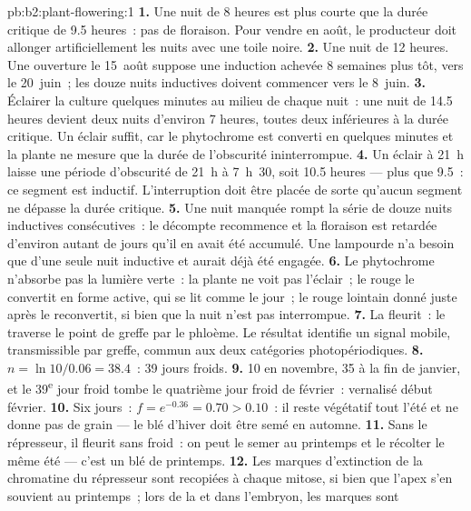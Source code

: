 \begin{solution}{pb:b2:plant-flowering:1}
\textbf{1.} Une nuit de 8 heures est plus courte que la durée critique
de 9.5 heures~: pas de floraison. Pour vendre en août, le producteur doit
allonger artificiellement les nuits avec une toile noire.
\textbf{2.} Une nuit de 12 heures. Une ouverture le 15~août suppose une
induction achevée 8 semaines plus tôt, vers le 20~juin~; les douze nuits
inductives doivent commencer vers le 8~juin.
\textbf{3.} Éclairer la culture quelques minutes au milieu de chaque
nuit~: une nuit de 14.5 heures devient deux nuits d'environ 7 heures,
toutes deux inférieures à la durée critique. Un éclair suffit, car le
phytochrome est converti en quelques minutes et la plante ne mesure que
la durée de l'obscurité ininterrompue.
\textbf{4.} Un éclair à 21~h laisse une période d'obscurité de 21~h à
7~h~30, soit 10.5 heures --- plus que 9.5~: ce segment est inductif.
L'interruption doit être placée de sorte qu'aucun segment ne dépasse la
durée critique.
\textbf{5.} Une nuit manquée rompt la série de douze nuits inductives
consécutives~: le décompte recommence et la floraison est retardée
d'environ autant de jours qu'il en avait été accumulé. Une lampourde n'a
besoin que d'une seule nuit inductive et aurait déjà été engagée.
\textbf{6.} Le phytochrome n'absorbe pas la lumière verte~: la plante ne
voit pas l'éclair~; le rouge le convertit en forme active, qui se lit
comme le jour~; le rouge lointain donné juste après le reconvertit, si
bien que la nuit n'est pas interrompue.
\textbf{7.} La  fleurit~: le  traverse le
point de greffe par le phloème. Le résultat identifie un signal mobile,
transmissible par greffe, commun aux deux catégories photopériodiques.
\textbf{8.} $n = \ln 10/0.06 = 38.4$~: 39 jours froids.
\textbf{9.} 10 en novembre, 35 à la fin de janvier, et le 39\textsuperscript{e}
jour froid tombe le quatrième jour froid de février~: vernalisé début
février.
\textbf{10.} Six jours~: $f = e^{-0.36} = 0.70 > 0.10$~: il reste végétatif
tout l'été et ne donne pas de grain --- le blé d'hiver doit être semé en
automne.
\textbf{11.} Sans le répresseur, il fleurit sans froid~: on peut le semer
au printemps et le récolter le même été --- c'est un blé de printemps.
\textbf{12.} Les marques d'extinction de la chromatine du répresseur sont
recopiées à chaque mitose, si bien que l'apex s'en souvient au
printemps~; lors de la  et dans l'embryon, les marques sont

\end{solution}
